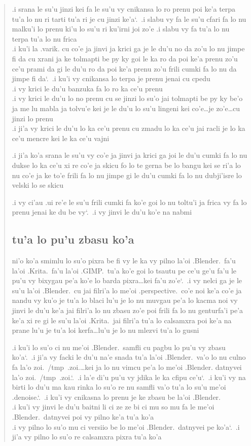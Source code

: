 \documentclass{report}
\newcommand\sds{\spacefactor\sfcode`.\ \space}
\begin{document}
\begin{quote}
	.i srana le su'u jinzi kei fa le su'u vy cnikansa lo ro prenu poi ke'a terpa tu'a lo nu ri tarti tu'a ri je cu jinzi ke'a\sds  .i slabu vy fa le su'u cfari fa lo nu malku'i lo prenu ki'u lo su'u ri ku'irni joi zo'e  .i slabu vy fa tu'a lo nu terpa tu'a lo nu frica \\
	.i ku'i la .varik. cu co'e ja jinvi ja krici ga je le du'u no da zo'u lo nu jimpe fi da cu xrani ja ke tolmapti be py ky goi le ka ro da poi ke'a prenu zo'u ce'u prami da gi le du'u ro da poi ke'a prenu zo'u frili cumki fa lo nu da jimpe fi da\sds  .i ku'i vy cnikansa lo terpa je prenu jenai cu cpedu \\
	.i vy krici le du'u banzuka fa lo ro ka ce'u prenu \\
	.i vy krici le du'u lo no prenu cu se jinzi lo su'o jai tolmapti be py ky be'o ja me lu mabla ja tolvu'e kei je le du'u lo su'u lingeni kei co'e\ldots je zo'e\ldots cu jinzi lo prenu \\
	.i ji'a vy krici le du'u lo ka ce'u prenu cu zmadu lo ka ce'u jai racli je lo ka ce'u mencre kei le ka ce'u vajni

	.i ji'a ko'a srana le su'u vy co'e ja jinvi ja krici ga joi le du'u cumki fa lo nu dukse lo ka ce'u xi re co'e ja skicu fo lo te gerna be lo bangu kei se ri'a lo nu co'e ja ke to'e frili fa lo nu jimpe gi le du'u cumki fa lo nu dubji'isre lo velski lo se skicu

	.i vy ci'au .ui re'e le su'u frili cumki fa ko'e goi lo nu toltu'i ja frica vy fa lo prenu jenai ke du be vy\sds  .i vy jinvi le du'u ko'e na nabmi

	\subsection{tu'a lo pu'u zbasu ko'a}
	ni'o ko'a smimlu lo su'o pixra be fi vy le ka vy pilno la'oi .Blender.\ fa'u la'oi .Krita.\ fa'u la'oi .GIMP.\ tu'a ko'e goi lo tsautu pe ce'u ge'u fa'u le pu'u vy bixygau pe'a ko'e lo barda pixra\ldots kei fa'u zo'e\sds  .i vy nelci ga je le su'u la'oi .Blender.\ cu jai filri'a lo me'oi .perspective.\ co'e noi ke'a co'e ja nandu vy ku'o je tu'a lo blaci lu'u je lo nu muvgau pe'a lo kacma noi vy jinvi le du'u ke'a jai filri'a lo nu zbasu zo'e poi frili fa lo nu genturfa'i pe'a ke'a xi re gi le su'u la'oi .Krita.\ jai filri'a tu'a lo calsamxra poi ke'a na prane lu'u je tu'a loi kerfa\ldots lu'u je lo nu mlezvi tu'a lo gusni

	.i ku'i lo su'o ci nu me'oi .Blender.\ samfli cu pagbu lo pu'u vy zbasu ko'a\sds  .i ji'a vy facki le du'u na'e snada tu'a la'oi .Blender.\ va'o lo nu culno fa la'o zoi.\ /tmp\ .zoi.\ldots kei ja lo nu vimcu pe'a lo me'oi .Blender. datnyvei la'o zoi.\ /tmp\ .zoi.\sds  .i la'e di'u pu'u vy jdika le ka cfipu ce'u\sds  .i ku'i vy na birti lo du'u ma kau rinka lo su'o re nu samfli va'o tu'a lo su'u me'oi .denoise.\sds  .i ku'i vy cnikasna lo prenu je ke zbasu be la'oi .Blender. \\
	.i ku'i vy jinvi le du'u baitni li ci ze ze bi ci mu so mu fa le me'oi .Blender.\ datnyvei poi vy pilno ke'a tu'a ko'a \\
	.i vy pilno lo su'o mu ci versiio be lo me'oi .Blender.\ datnyvei pe ko'a\sds  .i ji'a vy pilno lo su'o re calsamxra pixra tu'a ko'a


\end{quote}
\end{document}
